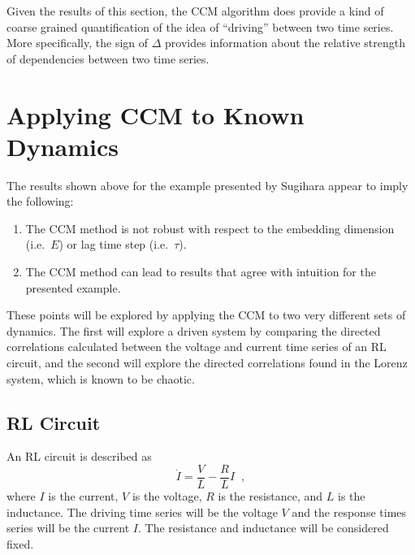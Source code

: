\documentclass[a4paper,11pt]{article}
\begin{document}
Given the results of this section, the CCM algorithm does provide a kind of coarse grained quantification of the idea of ``driving'' between two time series.  More specifically, the sign of $\Delta$ provides information about the relative strength of dependencies between two time series.

\section{Applying CCM to Known Dynamics}

The results shown above for the example presented by Sugihara appear to imply the following:
\begin{enumerate}
\item The CCM method is not robust with respect to the embedding dimension (i.e.\ $E$) or lag time step (i.e.\ $\tau$).
\item The CCM method can lead to results that agree with intuition for the presented example. 
\end{enumerate}
These points will be explored by applying the CCM to two very different sets of dynamics.  The first will explore a driven system by comparing the directed correlations calculated between the voltage and current time series of an RL circuit, and the second will explore the directed correlations found in the Lorenz system, which is known to be chaotic.

\subsection{RL Circuit}
An RL circuit is described as
$$
\dot{I} = \frac{V}{L} - \frac{R}{L} I\;\;,
$$
where $I$ is the current, $V$ is the voltage, $R$ is the resistance, and $L$ is the inductance.  The driving time series will be the voltage $V$ and the response times series will be the current $I$.  The resistance and inductance will be considered fixed.
\end{document}
